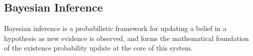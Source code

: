 \subsection{Bayesian Inference}
\label{sec:bayesian_background}

Bayesian inference is a probabilistic framework for updating a belief in a hypothesis as new evidence is observed, and forms the mathematical foundation of the existence probability update at the core of this system.
